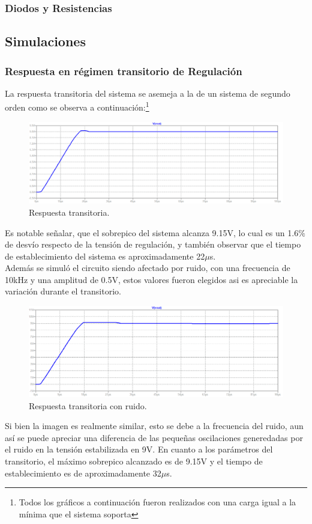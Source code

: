 \subsubsection{Diodos y Resistencias}

\subsection{Simulaciones}
\subsubsection{Respuesta en régimen transitorio de Regulación}
La respuesta transitoria del sistema se asemeja a la de un sistema de segundo orden como se observa a continuación:\footnote{Todos los gráficos a continuación fueron realizados con una carga igual a la mínima que el sistema soporta}
\begin{figure}[H]
\centering
	\includegraphics[width=1\textwidth]{ImagenesEjercicio2/transresp.png}
	\caption{Respuesta transitoria.}
	\label{fig:transitorioFuente}
\end{figure}
Es notable señalar, que el sobrepico del sistema alcanza 9.15V, lo cual es un 1.6$\%$ de desvío respecto de la tensión de regulación, y también observar que el tiempo de establecimiento del sistema es aproximadamente 22$\mu$s.\\
Además se simuló el circuito siendo afectado por ruido, con una frecuencia de 10kHz y una amplitud de 0.5V, estos valores fueron elegidos asi es apreciable la variación  durante el transitorio.
\begin{figure}[H]
\centering
	\includegraphics[width=1\textwidth]{ImagenesEjercicio2/transrespnoise.png}
	\caption{Respuesta transitoria con ruido.}
	\label{fig:transitorioFuentenoise}
\end{figure}
Si bien la imagen es realmente similar, esto se debe a la frecuencia del ruido, aun así se puede apreciar una diferencia de las pequeñas oscilaciones generedadas por el ruido en la tensión estabilizada en 9V. En cuanto a los parámetros del transitorio, el máximo sobrepico alcanzado es de 9.15V y el tiempo de establecimiento es de aproximadamente 32$\mu$s.
